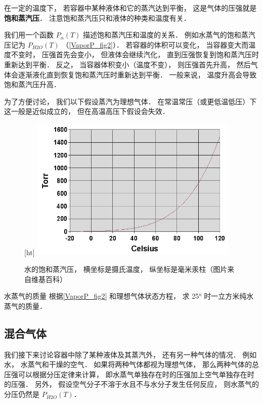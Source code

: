 

在一定的温度下， 若容器中某种液体和它的蒸汽达到平衡， 这是气体的压强就是\textbf{饱和蒸汽压}． 注意饱和蒸汽压只和液体的种类和温度有关．

我们用一个函数 $P_\alpha(T)$ 描述饱和蒸汽压和温度的关系． 例如水蒸气的饱和蒸汽压记为 $P_{H2O}(T)$ （\autoref{VaporP_fig2}）． 若容器的体积可以变化， 当容器变大而温度不变时， 压强首先会变小， 但液体会继续汽化， 直到压强恢复到饱和蒸汽压时重新达到平衡． 反之， 当容器体积变小（温度不变）， 则压强首先升高，  然后气体会逐渐液化直到恢复饱和蒸汽压时重新达到平衡． 一般来说， 温度升高会导致饱和蒸汽压升高．

为了方便讨论， 我们以下假设蒸汽为理想气体． 在常温常压（或更低温低压）下这一般是近似成立的， 但在高温高压下假设会失效．

\begin{figure}\label{VaporP_fig2}[ht]
\centering
\includegraphics[width=10cm]{./figures/VaporP1.png}
\caption{水的饱和蒸汽压， 横坐标是摄氏温度， 纵坐标是毫米汞柱（图片来自维基百科）} \label{VaporP_fig1}
\end{figure}

\begin{exercise}{水蒸气的质量}
根据\autoref{VaporP_fig2} 和理想气体状态方程， 求 25° 时一立方米纯水蒸气的质量．
\end{exercise}

\subsection{混合气体}
我们接下来讨论容器中除了某种液体及其蒸汽外， 还有另一种气体的情况． 例如水， 水蒸气和干燥的空气． 如果将两种气体都视为理想气体， 那么两种气体的总压强可以根据分压定律来计算， 即水蒸气单独存在时的压强加上空气单独存在时的压强． 另外， 假设空气分子不溶于水且不与水分子发生任何反应， 则水蒸气的分压仍然是 $P_{H2O}(T)$．


